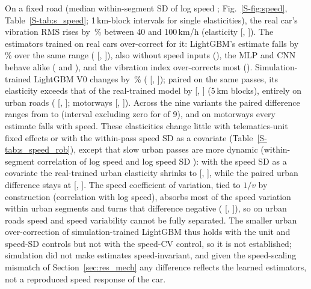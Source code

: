 On a fixed road (median within-segment SD of log speed \elSdLogv; Fig.~\ref{S-fig:speed}, Table~\ref{S-tab:s_speed}; 1\,km-block intervals for single elasticities), the real car's vibration RMS rises by \elRawPooledPct\,\% between 40 and 100\,km/h (elasticity \elRawPooled{} [\elRawPooledLo, \elRawPooledHi]).
The estimators trained on real cars over-correct for it: LightGBM's estimate falls by \elRealGbmPooledPct\,\% over the same range (\elRealGbmPooled{} [\elRealGbmPooledLo, \elRealGbmPooledHi]), also without speed inputs (\elRealGbmNoSpeedPooled), the MLP and CNN behave alike (\elRealMlpPooled{} and \elRealCnnPooled), and the vibration index over-corrects most (\elRealIdxPooled).
Simulation-trained LightGBM V0 changes by \elSimGbmPooledPct\,\% (\elSimGbmPooled{} [\elSimGbmPooledLo, \elSimGbmPooledHi]); paired on the same passes, its elasticity exceeds that of the real-trained model by \epVzeroPooled{} [\epVzeroPooledLo, \epVzeroPooledHi] (5\,km blocks), entirely on urban roads (\epVzeroUrban{} [\epVzeroUrbanLo, \epVzeroUrbanHi]; motorways \epVzeroMotorway{} [\epVzeroMotorwayLo, \epVzeroMotorwayHi]).
Across the nine variants the paired difference ranges from \epMeasPooledMin{} to \epMeasPooledMax{} (interval excluding zero for \epMeasPooledExcl{} of 9), and on motorways every estimate falls with speed.
These elasticities change little with telematics-unit fixed effects or with the within-pass speed SD as a covariate (Table~\ref{S-tab:s_speed_rob}), except that slow urban passes are more dynamic (within-segment correlation of log speed and log speed SD \srCorrLsdUrban): with the speed SD as a covariate the real-trained urban elasticity shrinks to \srRealUrbanLsd{} [\srRealUrbanLsdLo, \srRealUrbanLsdHi], while the paired urban difference stays at \srDiffUrbanLsd{} [\srDiffUrbanLsdLo, \srDiffUrbanLsdHi].
The speed coefficient of variation, tied to $1/v$ by construction (correlation \srCorrCvUrban{} with log speed), absorbs most of the speed variation within urban segments and turns that difference negative (\srDiffUrbanCv{} [\srDiffUrbanCvLo, \srDiffUrbanCvHi]), so on urban roads speed and speed variability cannot be fully separated.
The smaller urban over-correction of simulation-trained LightGBM thus holds with the unit and speed-SD controls but not with the speed-CV control, so it is not established; simulation did not make estimates speed-invariant, and given the speed-scaling mismatch of Section~\ref{sec:res_mech} any difference reflects the learned estimators, not a reproduced speed response of the car.
